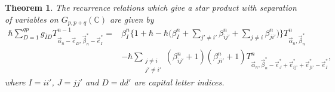 \documentclass[10pt,a4paper]{amsart}
\numberwithin{equation}{section}
\newtheorem{Theorem}{Theorem}[section]
\begin{document}
\begin{Theorem}\label{theorem_rec_rel_Grassmann_general}
The recurrence relations which give a star product with separation of variables on
$ G_{p,p+q}(\mathbb{C})$
are given by
\begin{align}
 \hbar
 \sum_{D=1}^{qp}
 g_{\overline{I}D}
 T^{n-1}_{\vec{\alpha}_{n}-\vec{e}_{D},\vec{\beta}_{n}^{\ast}-\vec{e}_{I}^{\ast}}
 ={}&
 \beta_{I}^{n}
 \bigg\{
 1
 +
 \hbar
 -
 \hbar
 \bigg(
 \beta_{I}^{n}
 +
 \sum_{j'\neq i'}
 \beta_{ij'}^{n}
 +
 \sum_{j\neq i}
 \beta_{ji'}^{n}
 \bigg)
 \bigg\}
 T^{n}_{\vec{\alpha}_{n},\vec{\beta}_{n}^{\ast}}\nonumber \\
 &
 -
 \hbar
 \sum_{
 \substack{
 j\neq i
 \\
 j'\neq i'}
 }
 (
 \beta_{ij'}^{n}
 +
 1
 )
 (
 \beta_{ji'}^{n}
 +
 1
 )
 T^{n}_{\vec{\alpha}_{n},\vec{\beta}_{n}^{\ast}-\vec{e}_{J}^{\ast}+\vec{e}_{ij'}^{\ast}+\vec{e}_{ji'}^{\ast}-\vec{e}_{I}^{\ast}}
 ,
\label{rec_rel_Grassmann_general}
\end{align}
where $I=ii'$, $J=jj'$ and $D=dd'$ are capital letter indices.
\end{Theorem}
\end{document}
